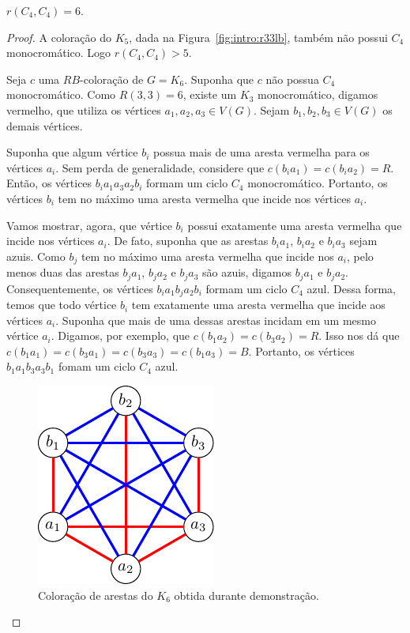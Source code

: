 \begin{theorem}
$r(C_4,C_4) = 6$.
\end{theorem}
\begin{proof}
A coloração do $K_5$, dada na Figura~\ref{fig:intro:r33lb}, também não possui $C_4$ monocromático. Logo $r(C_4,C_4) > 5$.

Seja $c$ uma $RB$-coloração de $G = K_6$. Suponha que $c$ não possua $C_4$ monocromático. Como $R(3,3) = 6$, existe um $K_3$ monocromático, digamos vermelho, que utiliza os vértices $a_1,a_2,a_3 \in V(G)$. Sejam $b_1,b_2,b_3 \in V(G)$ os demais vértices.

Suponha que algum vértice $b_i$ possua mais de uma aresta vermelha para os vértices $a_i$. Sem perda de generalidade, considere que $c(b_ia_1) = c(b_ia_2) = R$. Então, os vértices $b_i a_1 a_3 a_2 b_i$ formam um ciclo $C_4$ monocromático. Portanto, os vértices $b_i$ tem no máximo uma aresta vermelha que incide nos vértices $a_i$.

Vamos mostrar, agora, que vértice $b_i$ possui exatamente uma aresta vermelha que incide nos vértices $a_i$. De fato, suponha que as arestas $b_i a_1$, $b_i a_2$ e $b_i a_3$ sejam azuis. Como $b_j$ tem no máximo uma aresta vermelha que incide nos $a_i$, pelo menos duas das arestas $b_j a_1$, $b_j a_2$ e $b_j a_3$ são azuis, digamos $b_j a_1$ e $b_j a_2$. Consequentemente, os vértices $b_i a_1 b_j a_2 b_i$ formam um ciclo $C_4$ azul.
Dessa forma, temos que todo vértice $b_i$ tem exatamente uma aresta vermelha que incide aos vértices $a_i$. Suponha que mais de uma dessas arestas incidam em um mesmo vértice $a_i$. Digamos, por exemplo, que $c(b_1 a_2) = c(b_3 a_2) = R$. Isso nos dá que $c(b_1 a_1) = c(b_3 a_1) = c(b_3 a_3) = c(b_1 a_3) = B$. Portanto, os vértices $b_1 a_1 b_3 a_3 b_1$ fomam um ciclo $C_4$ azul.

\begin{figure}[ht!]
\centering
\includegraphics{figures/3_graph_3_cycle4}
\caption{Coloração de arestas do $K_6$ obtida durante demonstração.}
\label{graph:fig:cycle4}
\end{figure}


\end{proof}
